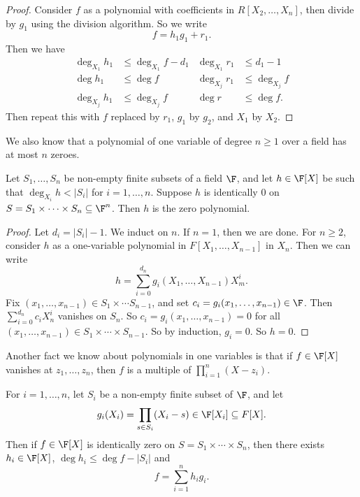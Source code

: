 \documentclass[a4paper]{article}
\begin{document}
\begin{proof}
  Consider $f$ as a polynomial with coefficients in $R[X_2, \ldots, X_n]$, then divide by $g_1$ using the division algorithm. So we write
  \[
    f = h_1 g_1 + r_1.
  \]
  Then we have
  \begin{align*}
    \deg_{X_1} h_1 &\leq \deg_{X_1} f - d_1 & \deg_{X_1} r_1 &\leq d_1 - 1\\
    \deg h_1 &\leq \deg f &                   \deg_{X_j} r_1 &\leq \deg_{X_j} f\\
    \deg_{X_j} h_1 &\leq \deg_{X_j}f &        \deg r &\leq \deg f.
  \end{align*}
  Then repeat this with $f$ replaced by $r_1$, $g_1$ by $g_2$, and $X_1$ by $X_2$.
\end{proof}

We also know that a polynomial of one variable of degree $n \geq 1$ over a field has at most $n$ zeroes.

\begin{lemma}
  Let $S_1, \ldots, S_n$ be non-empty finite subsets of a field $\F$, and let $h \in \F[X]$ be such that $\deg_{X_i} h < |S_i|$ for $i = 1, \ldots, n$. Suppose $h$ is identically $0$ on $S = S_1 \times \cdots \times S_n \subseteq \F^n$. Then $h$ is the zero polynomial.
\end{lemma}

\begin{proof}
  Let $d_i = |S_i| - 1$. We induct on $n$. If $n = 1$, then we are done. For $n \geq 2$, consider $h$ as a one-variable polynomial in $F[X_1, \ldots, X_{n - 1}]$ in $X_n$. Then we can write
  \[
    h = \sum_{i = 0}^{d_n} g_i(X_1, \ldots, X_{n - 1}) X_m^i.
  \]
  Fix $(x_1, \ldots, x_{n - 1}) \in S_1 \times \cdots S_{n - 1}$, and set $c_i = g_i(x_1, \ldots, x_{n - 1}) \in \F$. Then $\sum_{i = 0}^{d_n} c_i X_n^i$ vanishes on $S_n$. So $c_i = g_i(x_1, \ldots, x_{n - 1}) = 0$ for all $(x_1, \ldots, x_{n - 1}) \in S_1 \times \cdots \times S_{n - 1}$. So by induction, $g_i = 0$. So $h = 0$.
\end{proof}

Another fact we know about polynomials in one variables is that if $f \in \F[X]$ vanishes at $z_1, \ldots, z_n$, then $f$ is a multiple of $\prod_{i = 1}^n (X - z_i)$.
\begin{lemma}
  For $i = 1, \ldots, n$, let $S_i$ be a non-empty finite subset of $\F$, and let
  \[
    g_i(X_i) = \prod_{s \in S_i} (X_i - s) \in \F[X_i] \subseteq F[X].
  \]
  Then if $f \in \F[X]$ is identically zero on $S = S_1 \times \cdots \times S_n$, then there exists $h_i \in \F[X]$, $\deg h_i \leq \deg f - |S_i|$ and
  \[
    f = \sum_{i = 1}^n h_i g_i.
  \]
\end{lemma}
\end{document}
